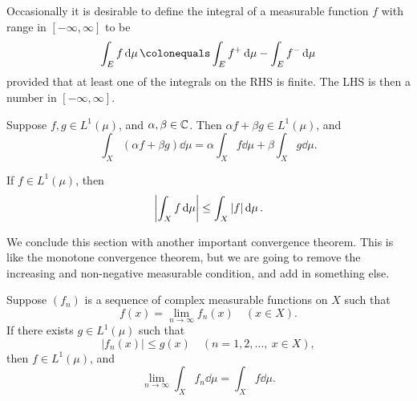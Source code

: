 Occasionally it is desirable to define the integral of a measurable function $f$ with range in $[-\infty,\infty]$ to be
\[\int_{E}f\dd{\mu}\colonequals\int_{E}f^+\dd{\mu}-\int_{E}f^-\dd{\mu}\]
provided that at least one of the integrals on the RHS is finite. The LHS is then a number in $[-\infty,\infty]$.

\begin{lemma}[Linearity]
Suppose $f,g\in L^1(\mu)$, and $\alpha,\beta\in\mathbb C$. Then $\alpha f+\beta g\in L^1(\mu)$, and
\[\int_{X}(\alpha f+\beta g)\dd{\mu}=\alpha\int_{X}f\dd{\mu}+\beta\int_{X}g\dd{\mu}.\]
\end{lemma}

\begin{lemma}
If $f\in L^1(\mu)$, then
\[\left|\int_{X}f\dd{\mu}\right|\le\int_{X}|f|\dd{\mu}.\]
\end{lemma}

We conclude this section with another important convergence theorem. 
This is like the monotone convergence theorem, but we are going to remove the increasing and non-negative measurable condition, and add in something else.

\begin{theorem}
Suppose $(f_n)$ is a sequence of complex measurable functions on $X$ such that
\[f(x)=\lim_{n\to\infty}f_n(x)\quad(x\in X).\]
If there exists $g\in L^1(\mu)$ such that
\[|f_n(x)|\le g(x)\quad(n=1,2,\dots,\:x\in X),\]
then $f\in L^1(\mu)$, and
\begin{equation}
\lim_{n\to\infty}\int_{X}f_n\dd{\mu}=\int_{X}f\dd{\mu}.
\end{equation}
\end{theorem}